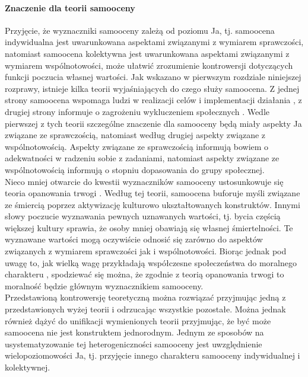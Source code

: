 \documentclass[man]{apa6}
\begin{document}
\paragraph{Znaczenie dla teorii samooceny} Przyjęcie, że wyznaczniki samooceny zależą od poziomu Ja, tj. samoocena indywidualna jest uwarunkowana aspektami związanymi z wymiarem sprawczości, natomiast samoocena kolektywna jest uwarunkowana aspektami związanymi z wymiarem wspólnotowości, może ułatwić zrozumienie kontrowersji dotyczących funkcji poczucia własnej wartości. Jak wskazano w pierwszym rozdziale niniejszej rozprawy, istnieje kilka teorii wyjaśniających do czego służy samoocena. Z jednej strony samoocena wspomaga ludzi w realizacji celów i implementacji działania \parencite{bandura1994self}, z drugiej strony informuje o zagrożeniu wykluczeniem społecznych \parencite{leary2000nature}. Wedle pierwszej z tych teorii szczególne znaczenie dla samooceny będą miały aspekty Ja związane ze sprawczością, natomiast według drugiej aspekty związane z wspólnotowością. Aspekty związane ze sprawczością informują bowiem o adekwatności w radzeniu sobie z zadaniami, natomiast aspekty związane ze wspólnotowością informują o stopniu dopasowania do grupy społecznej. \\

Nieco mniej otwarcie do kwestii wyznaczników samooceny ustosunkowuje się teoria opanowania trwogi \parencite{pyszczynski2004people}. Według tej teorii, samoocena buforuje myśli związane ze śmiercią poprzez aktywizację kulturowo ukształtowanych konstruktów. Innymi słowy poczucie wyznawania pewnych uznawanych wartości, tj. bycia częścią większej kultury sprawia, że osoby mniej obawiają się własnej śmiertelności. Te wyznawane wartości mogą oczywiście odnosić się zarówno do aspektów związanych z wymiarem sprawczości jak i wspólnotowości. Biorąc jednak pod uwagę to, jak wielką wagę przykładają współczesne społeczeństwa do moralnego charakteru \parencite[np.,][]{goodwin2014moral}, spodziewać się można, że zgodnie z teorią opanowania trwogi to moralność będzie głównym wyznacznikiem samooceny.\\

Przedstawioną kontrowersję teoretyczną można rozwiązać przyjmując jedną z przedstawionych wyżej teorii i odrzucając wszystkie pozostałe. Można jednak również dążyć do unifikacji wymienionych teorii przyjmując, że być może samoocena nie jest konstruktem jednorodnym. Jednym ze sposobów na usystematyzowanie tej heterogeniczności samooceny jest uwzględnienie wielopoziomowości Ja, tj. przyjęcie innego charakteru samooceny indywidualnej i kolektywnej.\\
\end{document}
